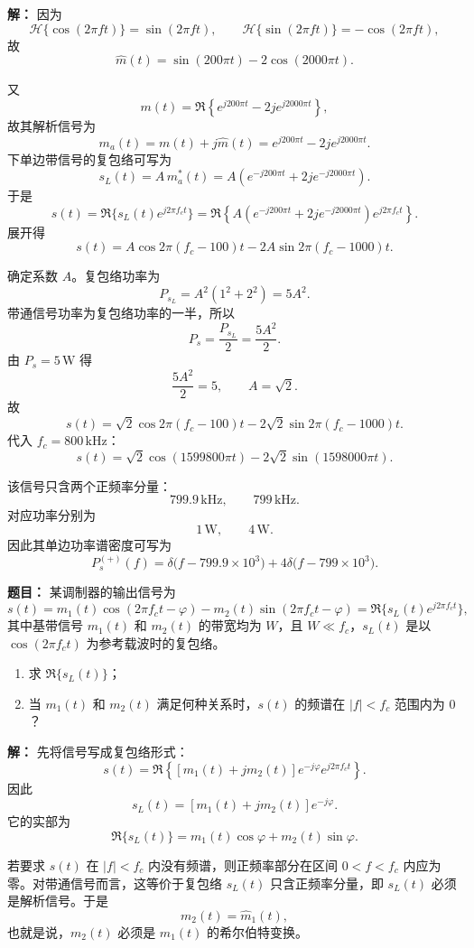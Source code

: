 \par\textbf{解：}
因为
\[
\mathcal{H}\{\cos(2\pi f t)\}=\sin(2\pi f t),\qquad
\mathcal{H}\{\sin(2\pi f t)\}=-\cos(2\pi f t),
\]
故
\[
\hat m(t)=\sin(200\pi t)-2\cos(2000\pi t).
\]

又
\[
m(t)=\Re\left\{e^{j200\pi t}-2je^{j2000\pi t}\right\},
\]
故其解析信号为
\[
m_a(t)=m(t)+j\hat m(t)=e^{j200\pi t}-2je^{j2000\pi t}.
\]
下单边带信号的复包络可写为
\[
s_L(t)=A\,m_a^*(t)=A\left(e^{-j200\pi t}+2je^{-j2000\pi t}\right).
\]
于是
\[
s(t)=\Re\{s_L(t)e^{j2\pi f_ct}\}
=\Re\left\{A\left(e^{-j200\pi t}+2je^{-j2000\pi t}\right)e^{j2\pi f_ct}\right\}.
\]
展开得
\[
s(t)=A\cos 2\pi(f_c-100)t-2A\sin 2\pi(f_c-1000)t.
\]

确定系数 $A$。复包络功率为
\[
P_{s_L}=A^2(1^2+2^2)=5A^2.
\]
带通信号功率为复包络功率的一半，所以
\[
P_s=\frac{P_{s_L}}{2}=\frac{5A^2}{2}.
\]
由 $P_s=5\,\mathrm{W}$ 得
\[
\frac{5A^2}{2}=5,\qquad A=\sqrt2.
\]
故
\[
s(t)=\sqrt2\cos 2\pi(f_c-100)t-2\sqrt2\sin 2\pi(f_c-1000)t.
\]
代入 $f_c=800\,\mathrm{kHz}$：
\[
s(t)=\sqrt2\cos(1599800\pi t)-2\sqrt2\sin(1598000\pi t).
\]

该信号只含两个正频率分量：
\[
799.9\,\mathrm{kHz},\qquad 799\,\mathrm{kHz}.
\]
对应功率分别为
\[
1\,\mathrm{W},\qquad 4\,\mathrm{W}.
\]
因此其单边功率谱密度可写为
\[
P_s^{(+)}(f)=\delta\bigl(f-799.9\times 10^3\bigr)+4\delta\bigl(f-799\times 10^3\bigr).
\]

\medskip
{}
\textbf{题目：}
某调制器的输出信号为
\[
s(t)=m_1(t)\cos(2\pi f_ct-\varphi)-m_2(t)\sin(2\pi f_ct-\varphi)
=\Re\{s_L(t)e^{j2\pi f_ct}\},
\]
其中基带信号 $m_1(t)$ 和 $m_2(t)$ 的带宽均为 $W$，且 $W\ll f_c$，$s_L(t)$ 是以 $\cos(2\pi f_ct)$ 为参考载波时的复包络。

\begin{enumerate}
\item 求 $\Re\{s_L(t)\}$；
\item 当 $m_1(t)$ 和 $m_2(t)$ 满足何种关系时，$s(t)$ 的频谱在 $|f|<f_c$ 范围内为 $0$？
\end{enumerate}

\par\textbf{解：}
先将信号写成复包络形式：
\[
s(t)=\Re\left\{[m_1(t)+jm_2(t)]e^{-j\varphi}e^{j2\pi f_ct}\right\}.
\]
因此
\[
s_L(t)=[m_1(t)+jm_2(t)]e^{-j\varphi}.
\]
它的实部为
\[
\Re\{s_L(t)\}=m_1(t)\cos\varphi+m_2(t)\sin\varphi.
\]

若要求 $s(t)$ 在 $|f|<f_c$ 内没有频谱，则正频率部分在区间 $0<f<f_c$ 内应为零。对带通信号而言，这等价于复包络 $s_L(t)$ 只含正频率分量，即 $s_L(t)$ 必须是解析信号。于是
\[
m_2(t)=\hat m_1(t),
\]
也就是说，$m_2(t)$ 必须是 $m_1(t)$ 的希尔伯特变换。

